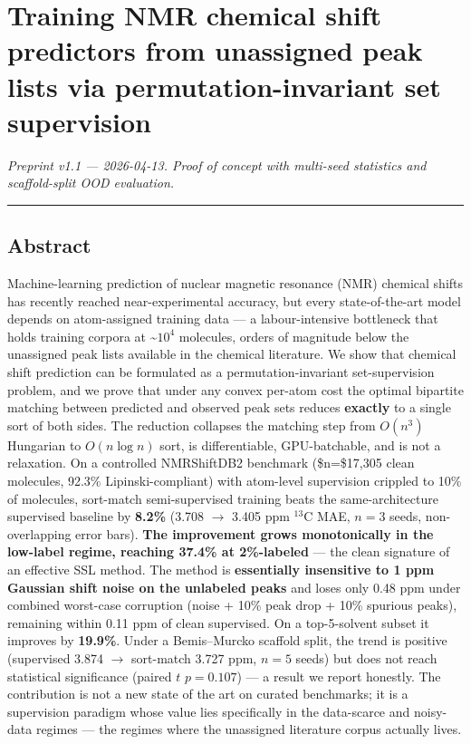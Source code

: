 \documentclass[
]{article}
\author{}
\date{}
\begin{document}
\section{Training NMR chemical shift predictors from unassigned peak
lists via permutation-invariant set
supervision}\label{training-nmr-chemical-shift-predictors-from-unassigned-peak-lists-via-permutation-invariant-set-supervision}

\emph{Preprint v1.1 --- 2026-04-13. Proof of concept with multi-seed
statistics and scaffold-split OOD evaluation.}

\begin{center}\rule{0.5\linewidth}{0.5pt}\end{center}

\subsection{Abstract}\label{abstract}

Machine-learning prediction of nuclear magnetic resonance (NMR) chemical
shifts has recently reached near-experimental accuracy, but every
state-of-the-art model depends on atom-assigned training data --- a
labour-intensive bottleneck that holds training corpora at
\textasciitilde{}\(10^4\) molecules, orders of magnitude below the
unassigned peak lists available in the chemical literature. We show that
chemical shift prediction can be formulated as a permutation-invariant
set-supervision problem, and we prove that under any convex per-atom
cost the optimal bipartite matching between predicted and observed peak
sets reduces \textbf{exactly} to a single sort of both sides. The
reduction collapses the matching step from \(O(n^3)\) Hungarian to
\(O(n\log n)\) sort, is differentiable, GPU-batchable, and is not a
relaxation. On a controlled NMRShiftDB2 benchmark (\$n=\$17,305 clean
molecules, 92.3\% Lipinski-compliant) with atom-level supervision
crippled to 10\% of molecules, sort-match semi-supervised training beats
the same-architecture supervised baseline by \textbf{8.2\%} (3.708
\(\rightarrow\) 3.405 ppm \(^{13}\)C MAE, \(n=3\) seeds, non-overlapping
error bars). \textbf{The improvement grows monotonically in the
low-label regime, reaching 37.4\% at 2\%-labeled} --- the clean
signature of an effective SSL method. The method is \textbf{essentially
insensitive to 1 ppm Gaussian shift noise on the unlabeled peaks} and
loses only 0.48 ppm under combined worst-case corruption (noise + 10\%
peak drop + 10\% spurious peaks), remaining within 0.11 ppm of clean
supervised. On a top-5-solvent subset it improves by \textbf{19.9\%}.
Under a Bemis--Murcko scaffold split, the trend is positive (supervised
3.874 \(\rightarrow\) sort-match 3.727 ppm, \(n=5\) seeds) but does not
reach statistical significance (paired \(t\) \(p=0.107\)) --- a result
we report honestly. The contribution is not a new state of the art on
curated benchmarks; it is a supervision paradigm whose value lies
specifically in the data-scarce and noisy-data regimes --- the regimes
where the unassigned literature corpus actually lives.
\end{document}
